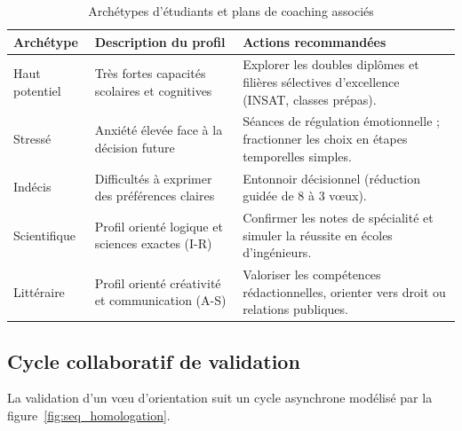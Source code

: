 \begin{table}[H]
\centering
\small
\begin{tabular}{|p{3cm}|p{4.5cm}|p{7.5cm}|}
\hline
\rowcolor{blue!15}
\textbf{Archétype} & \textbf{Description du profil} & \textbf{Actions recommandées} \\
\hline
Haut potentiel & Très fortes capacités scolaires et cognitives & Explorer les doubles diplômes et filières sélectives d'excellence (INSAT, classes prépas). \\
\hline
Stressé & Anxiété élevée face à la décision future & Séances de régulation émotionnelle ; fractionner les choix en étapes temporelles simples. \\
\hline
Indécis & Difficultés à exprimer des préférences claires & Entonnoir décisionnel (réduction guidée de 8 à 3 vœux). \\
\hline
Scientifique & Profil orienté logique et sciences exactes (I-R) & Confirmer les notes de spécialité et simuler la réussite en écoles d'ingénieurs. \\
\hline
Littéraire & Profil orienté créativité et communication (A-S) & Valoriser les compétences rédactionnelles, orienter vers droit ou relations publiques. \\
\hline
\end{tabular}
\caption{Archétypes d'étudiants et plans de coaching associés}
\label{tab:coaching_archetypes}
\end{table}

\subsection{Cycle collaboratif de validation}

La validation d'un vœu d'orientation suit un cycle asynchrone modélisé par la figure~\ref{fig:seq_homologation}.

